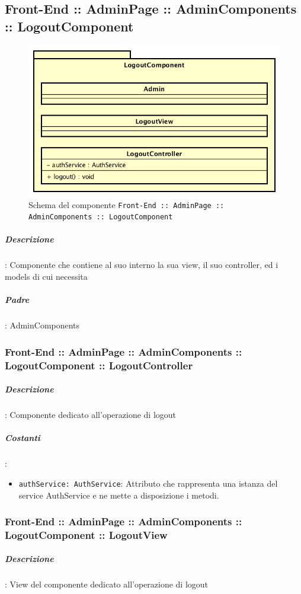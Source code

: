 \documentclass[../ManualeSviluppatore_v2.0.0.tex]{subfiles}
\begin{document}
	\subsection{Front-End :: AdminPage :: AdminComponents :: LogoutComponent}
	\begin{figure}[!h]
		\centering
		\includegraphics[scale=0.6]{Architettura/Front-End/AdminPage/AdminComponents/LogoutComponent.png}
		\caption{Schema del componente \texttt{Front-End :: AdminPage :: AdminComponents :: LogoutComponent}}
	\end{figure}

			\subparagraph{Descrizione}: Componente che contiene al suo interno la sua view, il suo controller, ed i models di cui necessita
			\subparagraph{Padre}: AdminComponents
	  		\subsubsection{Front-End :: AdminPage :: AdminComponents :: LogoutComponent :: LogoutController}
				\subparagraph{Descrizione}: Componente dedicato all'operazione di logout
				\subparagraph{Costanti}:
				\begin{itemize}
					\item \texttt{authService: AuthService}: Attributo che rappresenta una istanza del service AuthService e ne mette a disposizione i metodi.
				\end{itemize}
				\subsubsection{Front-End :: AdminPage :: AdminComponents :: LogoutComponent :: LogoutView}
				\subparagraph{Descrizione}: View del componente dedicato all'operazione di logout

	\newpage
\end{document}
